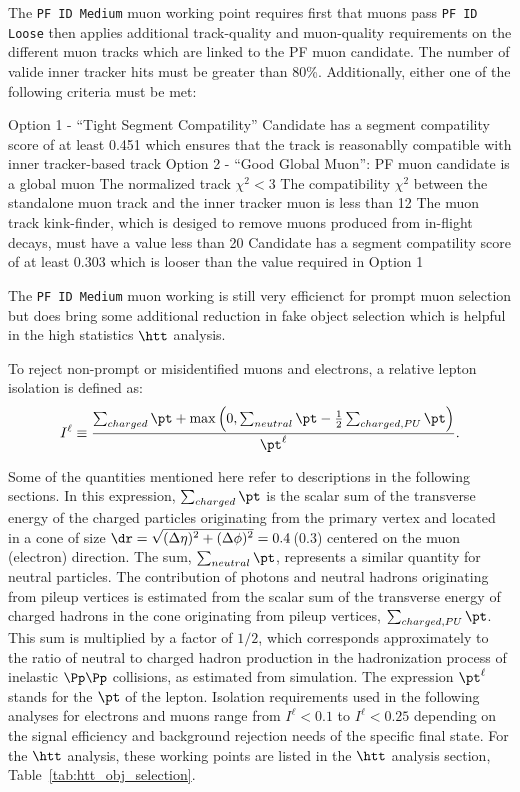 The \texttt{PF ID Medium} muon working point requires first that muons pass \texttt{PF ID Loose} then
applies additional track-quality and muon-quality requirements on the different muon tracks which are
linked to the PF muon candidate. The number of valide inner tracker
hits must be greater than 80\%. Additionally, either one of the following criteria must be met:
\begin{outline}
\1 Option 1 - ``Tight Segment Compatility''
    \2 Candidate has a segment compatility score of at least 0.451 which ensures that the 
track is reasonablly compatible with inner tracker-based track
\1 Option 2 - ``Good Global Muon'':
    \2 PF muon candidate is a global muon
    \2 The normalized track $\chi^2 < 3$
    \2 The compatibility $\chi^2$ between the standalone muon track and the inner tracker muon is
less than 12
    \2 The muon track kink-finder, which is desiged to remove muons produced from in-flight decays, 
must have a value less than 20
    \2 Candidate has a segment compatility score of at least 0.303 which is looser than the value
required in Option 1
\end{outline}
The \texttt{PF ID Medium} muon working is still very efficienct for prompt muon selection but
does bring some additional reduction in fake object selection which is helpful in the high
statistics $\htt$ analysis. 

To reject non-prompt or misidentified muons and electrons, a relative lepton isolation is defined as:
\begin{equation}
I^{\ell} \equiv \frac{\sum_{charged}  \pt + \max\left( 0, \sum_{neutral}  \pt
                                         - \frac{1}{2} \sum_{charged, PU} \pt  \right )}{\pt^{\ell}}.
\label{eqn:rel_isolation}
\end{equation}

Some of the quantities mentioned here refer to descriptions in the following sections.
In this expression, $\sum_{charged}  \pt$ is the scalar sum of the transverse energy of the 
charged particles originating from the primary vertex and located in a cone of size
$\dr = \sqrt{\smash[b]{(\Delta \eta)^2 + (\Delta \phi)^2}} = 0.4$\,(0.3)
centered on the muon (electron) direction. The sum, $\sum_{neutral}  \pt$, represents
a similar quantity for neutral particles. The contribution of photons and neutral hadrons 
originating from pileup vertices is estimated from the scalar sum of the transverse
energy of charged hadrons in the cone originating from pileup vertices,
$\sum_{charged, PU} \pt$. This sum is multiplied by a factor of $1/2$, which corresponds 
approximately to the ratio of neutral to charged hadron production in the hadronization process
of inelastic $\Pp\Pp$ collisions, as estimated from simulation. The expression $\pt^{\ell}$ 
stands for the $\pt$ of the lepton. Isolation requirements used in the following analyses
for electrons and muons range from $I^{\ell} < 0.1$ to $I^{\ell} < 0.25$ depending on the signal efficiency and
background rejection needs of the specific final state. For the $\htt$ analysis, these
working points are listed in the $\htt$ analysis section, Table~\ref{tab:htt_obj_selection}.


